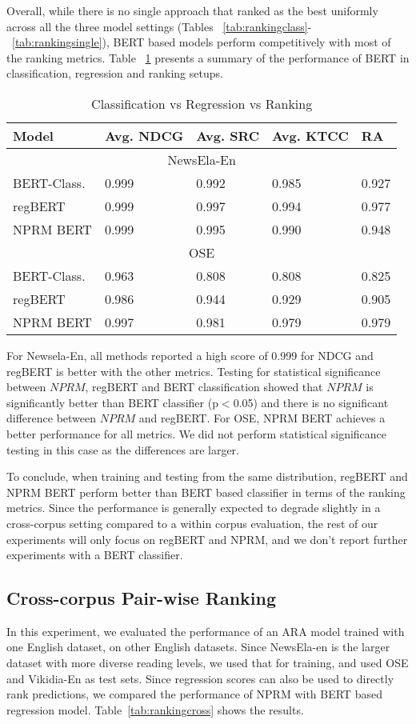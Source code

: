\documentclass[11pt]{article}
\begin{document}
Overall, while there is no single approach that ranked as the best uniformly across all the three model settings (Tables ~\ref{tab:rankingclass}-~\ref{tab:rankingsingle}), BERT based models perform competitively with most of the ranking metrics. Table ~\ref{tab:allthreebert} presents a summary of the performance of BERT in classification, regression and ranking setups. 

\begin{table}[htb]
\begin{tabular}{ |p{2.5cm}|p{0.9cm}|p{0.7cm}|p{0.9cm}| p{0.8cm}|}
 \hline
Model & Avg. NDCG & Avg. SRC & Avg. KTCC & RA\\
 \hline
\multicolumn{5}{|c|}{NewsEla-En} \\
\hline 
BERT-Class. & 0.999 & 0.992 &  0.985 & 0.927\\
regBERT & 0.999 & 0.997 & 0.994 & 0.977\\
NPRM BERT & 0.999 & 0.995 & 0.990 & 0.948\\
 \hline 
 \multicolumn{5}{|c|}{OSE}\\
 \hline
BERT-Class. & 0.963   & 0.808   & 0.808 & 0.825\\
regBERT & 0.986 & 0.944 & 0.929 & 0.905\\
NPRM BERT & 0.997  & 0.981 & 0.979 & 0.979\\
 \hline
\end{tabular}
\caption{Classification vs Regression vs Ranking}
\label{tab:allthreebert}
\end{table}
For Newsela-En, all methods reported a high score of 0.999 for NDCG and regBERT is better with the other metrics. Testing for statistical significance between $NPRM$, regBERT and BERT classification showed that $NPRM$ is significantly better than BERT classifier (p$<$0.05) and there is no significant difference between $NPRM$ and regBERT. For OSE, NPRM BERT achieves a better performance for all metrics. We did not perform statistical significance testing in this case as the differences are larger.  

To conclude, when training and testing from the same distribution, regBERT and NPRM BERT perform better than BERT based classifier in terms of the ranking metrics. Since the performance is generally expected to degrade slightly in a cross-corpus setting compared to a within corpus evaluation, the rest of our experiments will only focus on regBERT and NPRM, and we don't report further experiments with a BERT classifier. 

\subsection{Cross-corpus Pair-wise Ranking}
In this experiment, we evaluated the performance of an ARA model trained with one English dataset, on other English datasets. Since NewsEla-en is the larger dataset with more diverse reading levels, we used that for training, and used OSE and Vikidia-En as test sets. Since regression scores can also be used to directly rank predictions, we compared the performance of NPRM with BERT based regression model. Table~\ref{tab:rankingcross} shows the results. 
\end{document}
